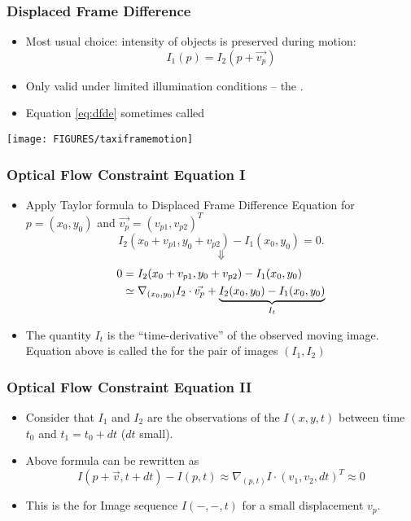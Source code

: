 \documentclass[10pt]{beamer}
\newcommand{\myemph}[1]{{\color{blue}{#1}}}
\begin{document}
\begin{frame}
  \frametitle{Displaced Frame Difference}
  \begin{itemize}
  \item Most usual choice: intensity of objects is preserved during motion:
    \begin{equation}
      \label{eq:dfde}
      I_1(p) = I_2(p+\vec{v_p})
    \end{equation}
  \item Only valid under limited illumination conditions -- the \myemph{Lambertian Model}.
  \item Equation \eqref{eq:dfde} sometimes called \myemph{Displaced Frame Difference Equation (DFDE)}
  \end{itemize}
  \begin{center}
    \texttt{[image: FIGURES/taxiframemotion]}
  \end{center}
\end{frame}




\begin{frame}
  \frametitle{Optical Flow Constraint Equation I}
  \begin{itemize}
  \item Apply Taylor formula to  Displaced Frame Difference Equation for $p=(x_0,y_0)$ and $\vec{v_p} = (v_{p1},v_{p2})^T$
    $$
    I_2(x_0 + v_{p1}, y_0 + v_{p2}) - I_1(x_0,y_0) = 0.
    $$
    $$
    \Downarrow
    $$
    \begin{align*}
      0 &= I_2(x_0 + v_{p1}, y_0 + v_{p2}) - I_1(x_0,y_0) \\
      &\simeq \nabla_{(x_0,y_0)} I_2\cdot \vec{v_p} + \underset{I_t}{\underbrace{I_2(x_0,y_0)-I_1(x_0,y_0)}}
    \end{align*}
  \item The quantity $I_t$ is the ``time-derivative'' of the observed
    moving image. Equation above is called the \myemph{Optical Flow
      Constraint Equation} for the pair of images $(I_1,I_2)$
  \end{itemize}
\end{frame}


\begin{frame}
  \frametitle{Optical Flow Constraint Equation II}
  \begin{itemize}
  \item Consider that $I_1$ and $I_2$ are the observations of the
    \myemph{Image Sequence} $I(x,y,t)$ between time $t_0$ and $t_1 =
    t_0 + dt$ ($dt$ small). 
  \item Above formula can be rewritten as
    $$
    I(p+\vec{v},t+dt) -I(p,t) \approx \nabla_{(p,t)} I\cdot (v_1,v_2,dt)^T \approx 0
    $$
  \item This is the \myemph{Optical Flow Constraint Equation (OFCE)}
    for Image sequence $I(-,-,t)$ for a small displacement $v_p$.
  \end{itemize}
\end{frame}
\end{document}
